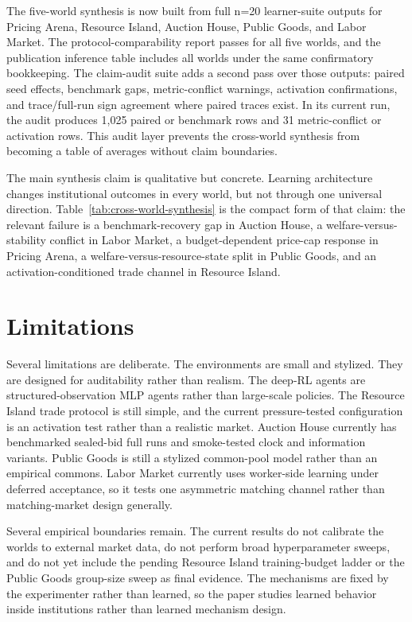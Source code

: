 \documentclass[11pt]{article}
\begin{document}
The five-world synthesis is now built from full n=20 learner-suite outputs for Pricing
Arena, Resource Island, Auction House, Public Goods, and Labor Market. The
protocol-comparability report passes for all five worlds, and the publication
inference table includes all worlds under the same confirmatory bookkeeping.
The claim-audit suite adds a second pass over those outputs: paired seed
effects, benchmark gaps, metric-conflict warnings, activation confirmations,
and trace/full-run sign agreement where paired traces exist. In its current
run, the audit produces 1,025 paired or benchmark rows and 31 metric-conflict
or activation rows. This audit layer prevents the cross-world synthesis from
becoming a table of averages without claim boundaries.

The main synthesis claim is qualitative but concrete. Learning architecture
changes institutional outcomes in every world, but not through one universal
direction. Table~\ref{tab:cross-world-synthesis} is the compact form of that
claim: the relevant failure is a benchmark-recovery gap in Auction House, a
welfare-versus-stability conflict in Labor Market, a budget-dependent
price-cap response in Pricing Arena, a welfare-versus-resource-state split in
Public Goods, and an activation-conditioned trade channel in Resource Island.

\section{Limitations}

Several limitations are deliberate. The environments are small and stylized.
They are designed for auditability rather than realism. The deep-RL agents are
structured-observation MLP agents rather than large-scale policies. The
Resource Island trade protocol is still simple, and the current pressure-tested
configuration is an activation test rather than a realistic market. Auction
House currently has benchmarked sealed-bid full runs and smoke-tested clock and
information variants. Public Goods is still a stylized common-pool model rather
than an empirical commons. Labor Market currently uses worker-side learning
under deferred acceptance, so it tests one asymmetric matching channel rather
than matching-market design generally.

Several empirical boundaries remain. The current results do not calibrate the
worlds to external market data, do not perform broad hyperparameter sweeps, and
do not yet include the pending Resource Island training-budget ladder or the
Public Goods group-size sweep as final evidence. The mechanisms are fixed by the
experimenter rather than learned, so the paper studies learned behavior inside
institutions rather than learned mechanism design.
\end{document}

